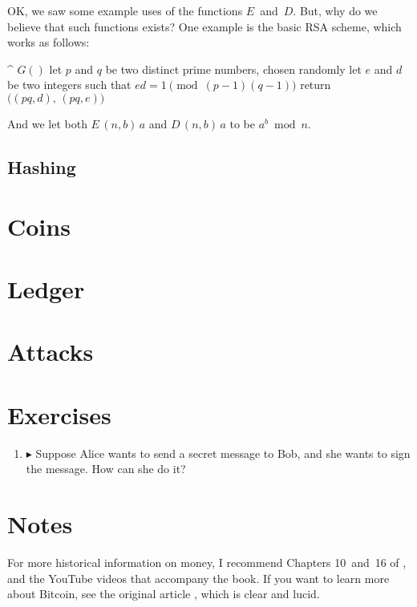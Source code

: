 OK, we saw some example uses of the functions $E$~and~$D$.
But, why do we believe that such functions exists?
One example is the basic RSA scheme, which works as follows:
\medskip
\begin{alg}
\^  $G()$
\0  let $p$ and $q$ be two distinct prime numbers, chosen randomly
\0  let $e$ and $d$ be two integers such that $ed = 1 \pmod{(p-1)(q-1)}$
\0  return $\bigl((pq,d),\, (pq,e)\bigr)$
\end{alg}
\medskip
\noindent
And we let both $E\,(n,b)\,a$ and $D\,(n,b)\,a$ to be $a^b \bmod n$.


\subsection{Hashing}

\section{Coins}\label{sec:bitcoin-coin}

\section{Ledger}\label{sec:bitcoin-ledger}

\section{Attacks}\label{sec:bitcoin-attacks}

\section{Exercises}

\begin{enumerate}
\item
  $\blacktriangleright$
  Suppose Alice wants to send a secret message to Bob, and she wants to sign the message.
  How can she do it?
\end{enumerate}

\section{Notes}

For more historical information on money, I recommend Chapters 10~and~16 of \citet{sapiens}, and the YouTube videos that accompany the book.
If you want to learn more about Bitcoin, see the original article \citep{bitcoin}, which is clear and lucid.




